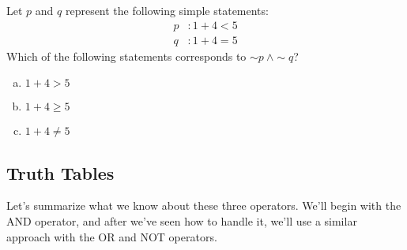 \begin{try}
Let $p$ and $q$ represent the following simple statements:
\begin{align*}
p &: 1+4<5\\
q &: 1+4=5
\end{align*}
Which of the following statements corresponds to $\sim p\ \wedge \sim q$?

\begin{enumerate}[(a)]
\item $1+4>5$
\item $1+4 \geq 5$
\item $1+4 \neq 5$
\end{enumerate}
\end{try}
\vfill
\pagebreak

\subsection{Truth Tables}
Let's summarize what we know about these three operators.  We'll begin with the AND operator, and after we've seen how to handle it, we'll use a similar approach with the OR and NOT operators.

